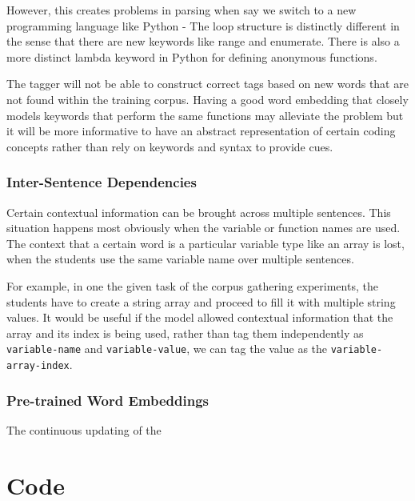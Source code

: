 \documentclass[fyp]{socreport}
\begin{document}
However, this creates problems in parsing when say we switch to a new
programming language like Python - The loop structure is distinctly different
in the sense that there are new keywords like range and enumerate. There is
also a more distinct lambda keyword in Python for defining anonymous functions.

The tagger will not be able to construct correct tags based on new words that
are not found within the training corpus. Having a good word embedding that
closely models keywords that perform the same functions may alleviate the problem
but it will be more informative to have an abstract representation of certain
coding concepts rather than rely on keywords and syntax to provide cues.


\subsection{Inter-Sentence Dependencies}
Certain contextual information can be brought across multiple sentences. This
situation happens most obviously when the variable or function names are used.
The context that a certain word is a particular variable type like an array is
lost, when the students use the same variable name over multiple sentences.

For example, in one the given task of the corpus gathering experiments, the
students have to create a string array and proceed to fill it with multiple
string values. It would be useful if the model allowed contextual information
that the array and its index is being used, rather than tag them independently
as \texttt{variable-name} and \texttt{variable-value}, we can tag the value as
the \texttt{variable-array-index}.


\subsection{Pre-trained Word Embeddings}
The continuous updating of the

\printbibliography[title={Whole bibliography}]

\appendix
\chapter{Code}
\end{document}
